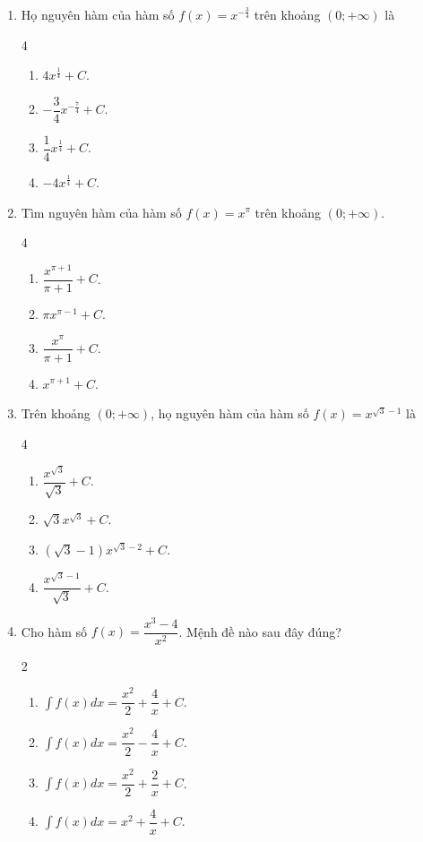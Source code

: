 \documentclass[12pt]{article}
\begin{document}
\begin{enumerate}[label=\textbf{Câu \arabic*.}]
		\item Họ nguyên hàm của hàm số $f(x) = x^{-\frac{3}{4}}$ trên khoảng $(0; +\infty)$ là
		\begin{multicols}{4}
			\begin{enumerate}[label=\textbf{\Alph*.}]
				\item $4x^{\frac{1}{4}} + C$.
				\item $-\dfrac{3}{4}x^{-\frac{7}{4}} + C$.
				\item $\dfrac{1}{4}x^{\frac{1}{4}} + C$.
				\item $-4x^{\frac{1}{4}} + C$.
			\end{enumerate}
		\end{multicols}
		
		\item Tìm nguyên hàm của hàm số $f(x) = x^\pi$ trên khoảng $(0; +\infty)$.
		\begin{multicols}{4}
			\begin{enumerate}[label=\textbf{\Alph*.}]
				\item $\dfrac{x^{\pi+1}}{\pi+1} + C$.
				\item $\pi x^{\pi-1} + C$.
				\item $\dfrac{x^\pi}{\pi+1} + C$.
				\item $x^{\pi+1} + C$.
			\end{enumerate}
		\end{multicols}
		
		\item Trên khoảng $(0; +\infty)$, họ nguyên hàm của hàm số $f(x) = x^{\sqrt{3}-1}$ là
		\begin{multicols}{4}
			\begin{enumerate}[label=\textbf{\Alph*.}]
				\item $\dfrac{x^{\sqrt{3}}}{\sqrt{3}} + C$.
				\item $\sqrt{3} x^{\sqrt{3}} + C$.
				\item $(\sqrt{3}-1) x^{\sqrt{3}-2} + C$.
				\item $\dfrac{x^{\sqrt{3}-1}}{\sqrt{3}} + C$.
			\end{enumerate}
		\end{multicols}
		
		\item Cho hàm số $f(x) = \dfrac{x^3 - 4}{x^2}$. Mệnh đề nào sau đây đúng?
		\begin{multicols}{2}
			\begin{enumerate}[label=\textbf{\Alph*.}]
				\item $\displaystyle \int f(x)dx = \dfrac{x^2}{2} + \dfrac{4}{x} + C$.
				\item $\displaystyle \int f(x)dx = \dfrac{x^2}{2} - \dfrac{4}{x} + C$.
				\item $\displaystyle \int f(x)dx = \dfrac{x^2}{2} + \dfrac{2}{x} + C$.
				\item $\displaystyle \int f(x)dx = x^2 + \dfrac{4}{x} + C$.
			\end{enumerate}
		\end{multicols}
		

\end{enumerate}
\end{document}
